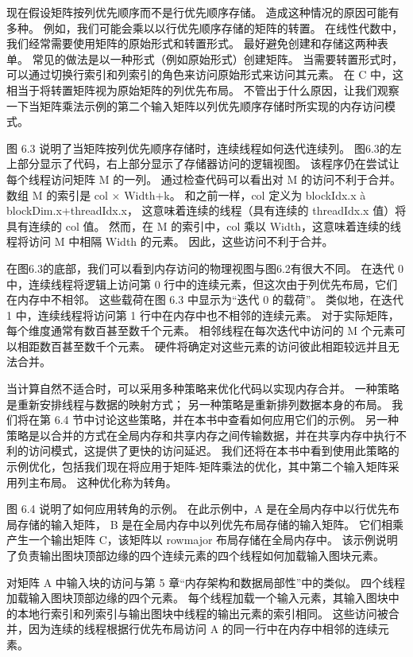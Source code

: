 现在假设矩阵按列优先顺序而不是行优先顺序存储。 造成这种情况的原因可能有多种。 
例如，我们可能会乘以以行优先顺序存储的矩阵的转置。 在线性代数中，我们经常需要使用矩阵的原始形式和转置形式。 
最好避免创建和存储这两种表单。 常见的做法是以一种形式（例如原始形式）创建矩阵。 
当需要转置形式时，可以通过切换行索引和列索引的角色来访问原始形式来访问其元素。 
在 C 中，这相当于将转置矩阵视为原始矩阵的列优先布局。 
不管出于什么原因，让我们观察一下当矩阵乘法示例的第二个输入矩阵以列优先顺序存储时所实现的内存访问模式。

图 6.3 说明了当矩阵按列优先顺序存储时，连续线程如何迭代连续列。 
图6.3的左上部分显示了代码，右上部分显示了存储器访问的逻辑视图。 该程序仍在尝试让每个线程访问矩阵 M 的一列。
通过检查代码可以看出对 M 的访问不利于合并。 数组 M 的索引是 col × Width+k。 
和之前一样，col 定义为 blockIdx.x à blockDim.x+threadIdx.x，
这意味着连续的线程（具有连续的 threadIdx.x 值）将具有连续的 col 值。 
然而，在 M 的索引中，col 乘以 Width，这意味着连续的线程将访问 M 中相隔 Width 的元素。 因此，这些访问不利于合并。

在图6.3的底部，我们可以看到内存访问的物理视图与图6.2有很大不同。 
在迭代 0 中，连续线程将逻辑上访问第 0 行中的连续元素，但这次由于列优先布局，它们在内存中不相邻。 
这些载荷在图 6.3 中显示为“迭代 0 的载荷”。 类似地，在迭代 1 中，连续线程将访问第 1 行中在内存中也不相邻的连续元素。 
对于实际矩阵，每个维度通常有数百甚至数千个元素。 相邻线程在每次迭代中访问的 M 个元素可以相距数百甚至数千个元素。 
硬件将确定对这些元素的访问彼此相距较远并且无法合并。

当计算自然不适合时，可以采用多种策略来优化代码以实现内存合并。 
一种策略是重新安排线程与数据的映射方式； 另一种策略是重新排列数据本身的布局。 
我们将在第 6.4 节中讨论这些策略，并在本书中查看如何应用它们的示例。 
另一种策略是以合并的方式在全局内存和共享内存之间传输数据，并在共享内存中执行不利的访问模式，这提供了更快的访问延迟。 
我们还将在本书中看到使用此策略的示例优化，包括我们现在将应用于矩阵-矩阵乘法的优化，其中第二个输入矩阵采用列主布局。 
这种优化称为转角。

图 6.4 说明了如何应用转角的示例。 在此示例中，A 是在全局内存中以行优先布局存储的输入矩阵，
B 是在全局内存中以列优先布局存储的输入矩阵。 它们相乘产生一个输出矩阵 C，该矩阵以 rowmajor 布局存储在全局内存中。 
该示例说明了负责输出图块顶部边缘的四个连续元素的四个线程如何加载输入图块元素。

对矩阵 A 中输入块的访问与第 5 章“内存架构和数据局部性”中的类似。 四个线程加载输入图块顶部边缘的四个元素。 
每个线程加载一个输入元素，其输入图块中的本地行索引和列索引与输出图块中线程的输出元素的索引相同。 
这些访问被合并，因为连续的线程根据行优先布局访问 A 的同一行中在内存中相邻的连续元素。

